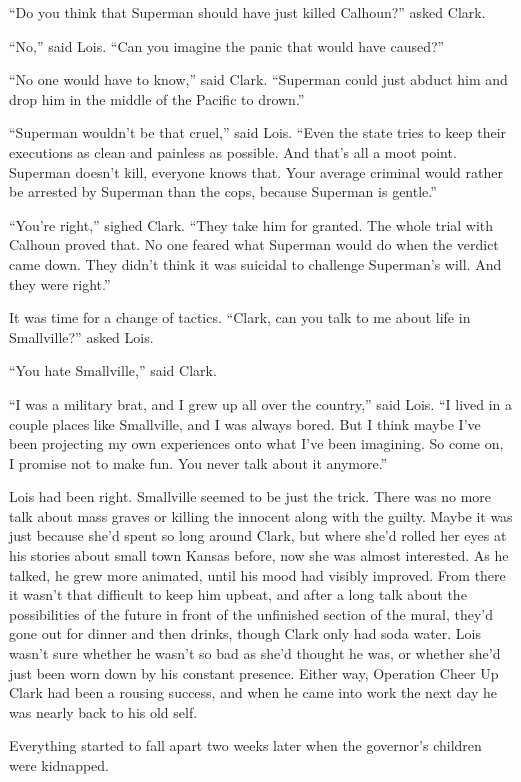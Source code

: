 ``Do you think that Superman should have just killed Calhoun?'' asked
Clark.

``No,'' said Lois. ``Can you imagine the panic that would have caused?''

``No one would have to know,'' said Clark. ``Superman could just abduct
him and drop him in the middle of the Pacific to drown.''

``Superman wouldn't be that cruel,'' said Lois. ``Even the state tries
to keep their executions as clean and painless as possible. And that's
all a moot point. Superman doesn't kill, everyone knows that. Your
average criminal would rather be arrested by Superman than the cops,
because Superman is gentle.''

``You're right,'' sighed Clark. ``They take him for granted. The whole
trial with Calhoun proved that. No one feared what Superman would do
when the verdict came down. They didn't think it was suicidal to
challenge Superman's will. And they were right.''

It was time for a change of tactics. ``Clark, can you talk to me about
life in Smallville?'' asked Lois.

``You hate Smallville,'' said Clark.

``I was a military brat, and I grew up all over the country,'' said
Lois. ``I lived in a couple places like Smallville, and I was always
bored. But I think maybe I've been projecting my own experiences onto
what I've been imagining. So come on, I promise not to make fun. You
never talk about it anymore.''

Lois had been right. Smallville seemed to be just the trick. There was
no more talk about mass graves or killing the innocent along with the
guilty. Maybe it was just because she'd spent so long around Clark, but
where she'd rolled her eyes at his stories about small town Kansas
before, now she was almost interested. As he talked, he grew more
animated, until his mood had visibly improved. From there it wasn't that
difficult to keep him upbeat, and after a long talk about the
possibilities of the future in front of the unfinished section of the
mural, they'd gone out for dinner and then drinks, though Clark only had
soda water. Lois wasn't sure whether he wasn't so bad as she'd thought
he was, or whether she'd just been worn down by his constant presence.
Either way, Operation Cheer Up Clark had been a rousing success, and
when he came into work the next day he was nearly back to his old self.

Everything started to fall apart two weeks later when the governor's
children were kidnapped.

